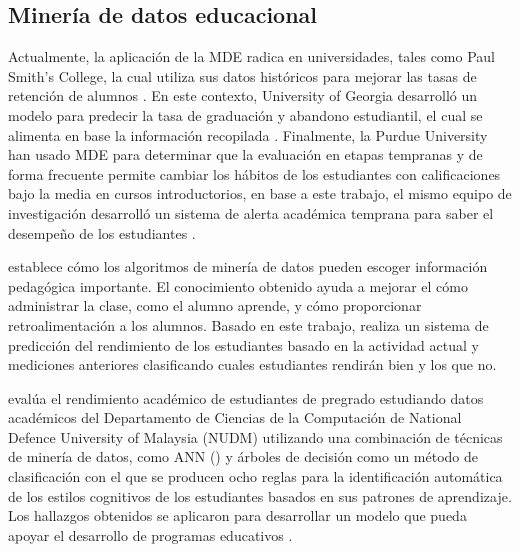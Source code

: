 \subsection{Minería de datos educacional}


Actualmente, la aplicación de la MDE radica en universidades, tales como Paul Smith’s College, la cual utiliza sus datos históricos para mejorar las tasas de retención de alumnos \parencite{bichsel2012analytics}. En este contexto, University of Georgia desarrolló un modelo para predecir la tasa de graduación y abandono estudiantil, el cual se alimenta en base la información recopilada \parencite{morris2005predicting}. Finalmente, la Purdue University han usado MDE para determinar que la evaluación en etapas tempranas y de forma frecuente permite cambiar los hábitos de los estudiantes con calificaciones bajo la media en cursos introductorios, en base a este trabajo, el mismo equipo de investigación desarrolló un sistema de alerta académica temprana para saber el desempeño de los estudiantes \parencite{baepler2010academic}. 

\textcite{merceron2005educational} establece cómo los algoritmos de minería de datos pueden escoger información pedagógica importante. El conocimiento obtenido ayuda a mejorar el cómo administrar la clase, como el alumno aprende, y cómo proporcionar retroalimentación a los alumnos. Basado en este trabajo, \textcite{abdullah2014students} realiza un sistema de predicción del rendimiento de los estudiantes basado en la actividad actual y mediciones anteriores clasificando cuales estudiantes rendirán bien y los que no. 

\textcite{chen2008integrated} evalúa el rendimiento académico de estudiantes de pregrado estudiando datos académicos del Departamento de Ciencias de la Computación de National Defence University of Malaysia (NUDM) utilizando una combinación de técnicas de minería de datos, como ANN () y árboles de decisión como un método de clasificación con el que se producen ocho reglas para la identificación automática de los estilos cognitivos de los estudiantes basados en sus patrones de aprendizaje. Los hallazgos obtenidos se aplicaron para desarrollar un modelo que pueda apoyar el desarrollo de programas educativos .

